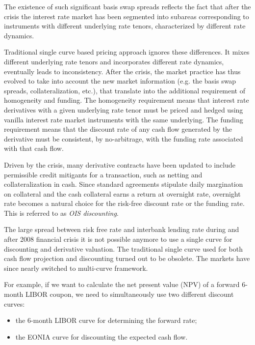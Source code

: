 The existence of such significant basis swap spreads reflects the fact that after
the crisis the interest rate market has been segmented into subareas corresponding
to instruments with different underlying rate tenors, characterized by different 
rate dynamics. 

Traditional single curve based pricing approach ignores these differences. 
It mixes different underlying rate tenors and incorporates different rate dynamics,
eventually leads to inconsistency.
After the crisis, the market practice has thus evolved to take into account the new
market information (e.g. the basis swap spreads, collateralization, etc.), that
translate into the additional requirement of homogeneity and funding. 
The homogeneity requirement means that interest rate derivatives with a given
underlying rate tenor must be priced and hedged using vanilla interest rate
market instruments with the same underlying. The funding requirement means that 
the discount rate of any cash flow generated by the derivative must be consistent, 
by no-arbitrage, with the funding rate associated with that cash flow. 

Driven by the crisis, many derivative contracts have been updated to include permissible credit mitigants for a transaction, such as netting and collateralization in cash.
Since standard agreements stipulate daily margination on collateral and the cash
collateral earns a return at overnight rate,
overnight rate becomes a natural choice for the risk-free discount rate or
the funding rate. This is referred to as \emph{OIS discounting}.

The large spread between risk free rate and interbank lending rate during and after
2008 financial crisis it is not possible anymore to use a single curve for
discounting and derivative valuation. The traditional single curve used for both 
cash flow projection and discounting turned out to be obsolete. The markets
have since nearly switched to multi-curve framework. 

For example, if we want to calculate the net present value (NPV) of a forward 6-month 
LIBOR coupon, we need to simultaneously use two different discount curves:

\begin{itemize}
\tightlist
\item the 6-month LIBOR curve for determining the forward rate;
\item the EONIA curve for discounting the expected cash flow.
\end{itemize}

